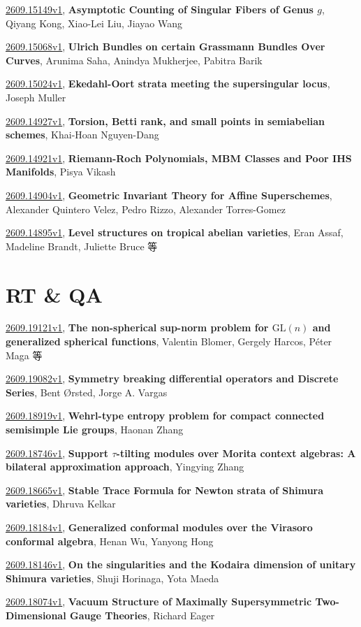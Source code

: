\documentclass[9pt, a4paper]{article}
\theoremstyle{plain}
\theoremstyle{definition}
\theoremstyle{remark}
\newcommand{\arxiv}[3]{\href{https://arxiv.org/abs/#1}{#1}, \textbf{\textcolor{arxivblue}{#2}}, #3}
\begin{document}
\arxiv{2609.15149v1}{Asymptotic Counting of Singular Fibers of Genus $g$}{Qiyang Kong, Xiao-Lei Liu, Jiayao Wang}

\arxiv{2609.15068v1}{Ulrich Bundles on certain Grassmann Bundles Over Curves}{Arunima Saha, Anindya Mukherjee, Pabitra Barik}

\arxiv{2609.15024v1}{Ekedahl-Oort strata meeting the supersingular locus}{Joseph Muller}

\arxiv{2609.14927v1}{Torsion, Betti rank, and small points in semiabelian schemes}{Khai-Hoan Nguyen-Dang}

\arxiv{2609.14921v1}{Riemann-Roch Polynomials, MBM Classes and Poor IHS Manifolds}{Pisya Vikash}

\arxiv{2609.14904v1}{Geometric Invariant Theory for Affine Superschemes}{Alexander Quintero Velez, Pedro Rizzo, Alexander Torres-Gomez}

\arxiv{2609.14895v1}{Level structures on tropical abelian varieties}{Eran Assaf, Madeline Brandt, Juliette Bruce 等}


\section{RT \& QA}
\arxiv{2609.19121v1}{The non-spherical sup-norm problem for $\mathrm{GL}(n)$ and generalized spherical functions}{Valentin Blomer, Gergely Harcos, Péter Maga 等}

\arxiv{2609.19082v1}{Symmetry breaking differential operators and Discrete Series}{Bent Ørsted, Jorge A. Vargas}

\arxiv{2609.18919v1}{Wehrl-type entropy problem for compact connected semisimple Lie groups}{Haonan Zhang}

\arxiv{2609.18746v1}{Support $τ$-tilting modules over Morita context algebras: A bilateral approximation approach}{Yingying Zhang}

\arxiv{2609.18665v1}{Stable Trace Formula for Newton strata of Shimura varieties}{Dhruva Kelkar}

\arxiv{2609.18184v1}{Generalized conformal modules over the Virasoro conformal algebra}{Henan Wu, Yanyong Hong}

\arxiv{2609.18146v1}{On the singularities and the Kodaira dimension of unitary Shimura varieties}{Shuji Horinaga, Yota Maeda}

\arxiv{2609.18074v1}{Vacuum Structure of Maximally Supersymmetric Two-Dimensional Gauge Theories}{Richard Eager}
\end{document}
